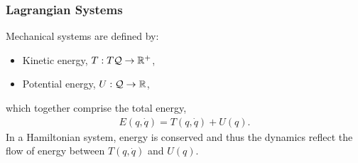 \documentclass{beamer}
\newcommand{\sQ}{\mathcal{Q}}
\begin{document}
\begin{frame}
  \frametitle{Lagrangian Systems}
  Mechanical systems are defined by:
  \begin{itemize}
  \item Kinetic energy, $T : T\sQ \to \R^+$,\\
  \item  Potential energy, $U : \sQ \to \R$,
  \end{itemize}
  which together comprise the total energy,
  \begin{align*}
    E(q, \dot q) = T(q, \dot q) + U(q).
  \end{align*}
  In a Hamiltonian system, energy is conserved and thus the dynamics reflect the flow of energy between $T(q, \dot q)$ and $U(q)$.
\end{frame}
\end{document}
